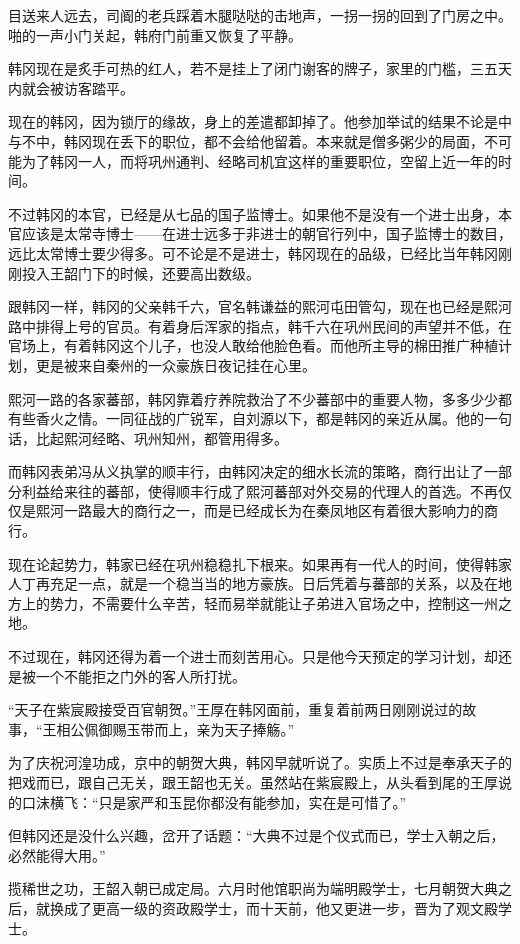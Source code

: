 目送来人远去，司阍的老兵踩着木腿哒哒的击地声，一拐一拐的回到了门房之中。啪的一声小门关起，韩府门前重又恢复了平静。

韩冈现在是炙手可热的红人，若不是挂上了闭门谢客的牌子，家里的门槛，三五天内就会被访客踏平。

现在的韩冈，因为锁厅的缘故，身上的差遣都卸掉了。他参加举试的结果不论是中与不中，韩冈现在丢下的职位，都不会给他留着。本来就是僧多粥少的局面，不可能为了韩冈一人，而将巩州通判、经略司机宜这样的重要职位，空留上近一年的时间。

不过韩冈的本官，已经是从七品的国子监博士。如果他不是没有一个进士出身，本官应该是太常寺博士——在进士远多于非进士的朝官行列中，国子监博士的数目，远比太常博士要少得多。可不论是不是进士，韩冈现在的品级，已经比当年韩冈刚刚投入王韶门下的时候，还要高出数级。

跟韩冈一样，韩冈的父亲韩千六，官名韩谦益的熙河屯田管勾，现在也已经是熙河路中排得上号的官员。有着身后浑家的指点，韩千六在巩州民间的声望并不低，在官场上，有着韩冈这个儿子，也没人敢给他脸色看。而他所主导的棉田推广种植计划，更是被来自秦州的一众豪族日夜记挂在心里。

熙河一路的各家蕃部，韩冈靠着疗养院救治了不少蕃部中的重要人物，多多少少都有些香火之情。一同征战的广锐军，自刘源以下，都是韩冈的亲近从属。他的一句话，比起熙河经略、巩州知州，都管用得多。

而韩冈表弟冯从义执掌的顺丰行，由韩冈决定的细水长流的策略，商行出让了一部分利益给来往的蕃部，使得顺丰行成了熙河蕃部对外交易的代理人的首选。不再仅仅是熙河一路最大的商行之一，而是已经成长为在秦凤地区有着很大影响力的商行。

现在论起势力，韩家已经在巩州稳稳扎下根来。如果再有一代人的时间，使得韩家人丁再充足一点，就是一个稳当当的地方豪族。日后凭着与蕃部的关系，以及在地方上的势力，不需要什么辛苦，轻而易举就能让子弟进入官场之中，控制这一州之地。

不过现在，韩冈还得为着一个进士而刻苦用心。只是他今天预定的学习计划，却还是被一个不能拒之门外的客人所打扰。

“天子在紫宸殿接受百官朝贺。”王厚在韩冈面前，重复着前两日刚刚说过的故事，“王相公佩御赐玉带而上，亲为天子捧觞。”

为了庆祝河湟功成，京中的朝贺大典，韩冈早就听说了。实质上不过是奉承天子的把戏而已，跟自己无关，跟王韶也无关。虽然站在紫宸殿上，从头看到尾的王厚说的口沫横飞：“只是家严和玉昆你都没有能参加，实在是可惜了。”

但韩冈还是没什么兴趣，岔开了话题：“大典不过是个仪式而已，学士入朝之后，必然能得大用。”

揽稀世之功，王韶入朝已成定局。六月时他馆职尚为端明殿学士，七月朝贺大典之后，就换成了更高一级的资政殿学士，而十天前，他又更进一步，晋为了观文殿学士。

